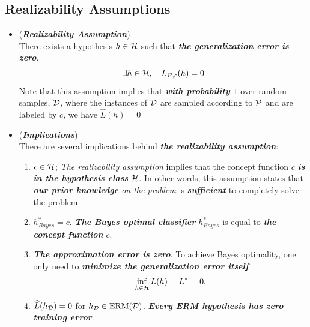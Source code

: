 \documentclass[11pt]{article}
\begin{document}
\subsection{Realizability Assumptions}
\begin{itemize}
\item \begin{definition}(\textbf{\emph{Realizability Assumption}})\\
There exists a hypothesis $h \in {\mathcal H}$ such that \emph{\textbf{the generalization error is zero}}.
\begin{align*}
\exists h\in {\mathcal H}, \quad  L_{{\mathcal P}, c}(h) = 0
\end{align*}  Note that this assumption implies that \emph{\textbf{with probability $1$}} over random samples, ${\mathcal D}$, where the instances of ${\mathcal D}$ are sampled according to ${\mathcal P}$ and are labeled by $c$, we have  $\widehat{L}(h) = 0$
\end{definition}

\item \begin{remark} (\textbf{\emph{Implications}})\\
There are several implications behind \emph{\textbf{the realizability assumption}}:
\begin{enumerate}
\item $c \in {\mathcal H}$; \emph{The realizability assumption} implies that the concept function $c$ \emph{\textbf{is in the hypothesis class}} ${\mathcal H}$. In other words, this assumption states that \emph{\textbf{our prior knowledge} on the problem} is \emph{\textbf{sufficient}} to completely solve the problem. 

\item $h_{Bayes}^{*} = c$. \emph{\textbf{The Bayes optimal classifier}} $h_{Bayes}^{*}$ is equal to \emph{\textbf{the concept function}} $c$.

\item  \emph{\textbf{The approximation error is zero}}. To achieve Bayes optimality, one only need to \emph{\textbf{minimize the generalization error itself}}
\begin{align*}
\inf_{h\in {\mathcal H}}L(h) = L^{*} = 0.
\end{align*}

\item $\widehat{L}(h_{{\mathcal D}}) = 0$ for $h_{{\mathcal D}} \in \text{ERM}({\mathcal D})$.  \emph{\textbf{Every ERM hypothesis has zero training error}}.
\end{enumerate}
\end{remark}


\end{itemize}
\end{document}
